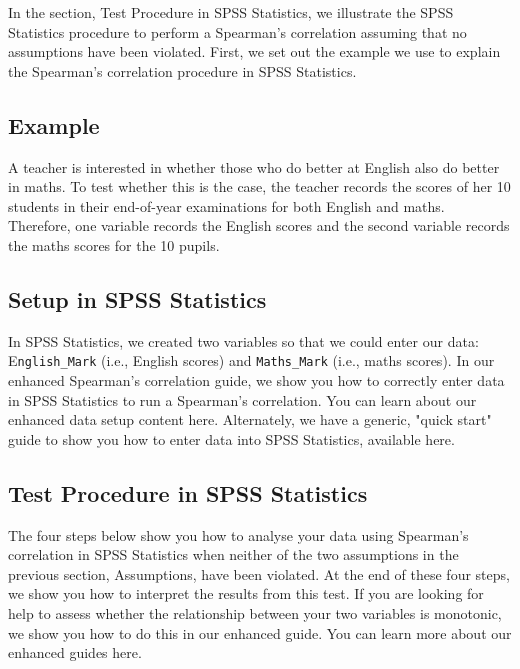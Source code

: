 \documentclass[]{article}
\begin{document}
In the section, Test Procedure in SPSS Statistics, we illustrate the SPSS Statistics procedure to perform a Spearman’s correlation assuming that no assumptions have been violated. First, we set out the example we use to explain the Spearman’s correlation procedure in SPSS Statistics.

\subsection{Example}
A teacher is interested in whether those who do better at English also do better in maths. To test whether this is the case, the teacher records the scores of her 10 students in their end-of-year examinations for both English and maths. Therefore, one variable records the English scores and the second variable records the maths scores for the 10 pupils.


\subsection{Setup in SPSS Statistics}
In SPSS Statistics, we created two variables so that we could enter our data: E\texttt{nglish\_Mark} (i.e., English scores) and \texttt{Maths\_Mark} (i.e., maths scores). In our enhanced Spearman's correlation guide, we show you how to correctly enter data in SPSS Statistics to run a Spearman's correlation. You can learn about our enhanced data setup content here. Alternately, we have a generic, "quick start" guide to show you how to enter data into SPSS Statistics, available here.


\subsection{Test Procedure in SPSS Statistics}
The four steps below show you how to analyse your data using Spearman’s correlation in SPSS Statistics when neither of the two assumptions in the previous section, Assumptions, have been violated. At the end of these four steps, we show you how to interpret the results from this test. If you are looking for help to assess whether the relationship between your two variables is monotonic, we show you how to do this in our enhanced guide. You can learn more about our enhanced guides here.
\end{document}

